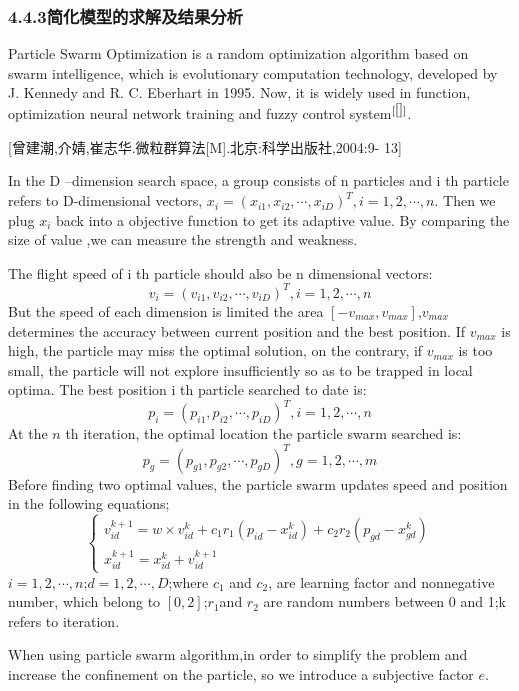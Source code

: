 \subsubsection{4.4.3简化模型的求解及结果分析}
Particle Swarm Optimization is a random optimization algorithm based on swarm intelligence, which is evolutionary computation technology, developed by J. Kennedy and R. C. Eberhart in 1995. Now, it is widely used in function, optimization neural network training and fuzzy control system$^{[\ref{}]}$.\par

[曾建潮,介婧,崔志华.微粒群算法[M].北京:科学出版社,2004:9- 13]

In the D –dimension search space, a group consists of n particles and i th particle refers to D-dimensional vectors, $x_i=(x_{i1},x_{i2},\cdots,x_{iD})^T,i=1,2,\cdots,n$. Then we plug $x_i$ back into a objective function to get its adaptive value. By comparing the size of value ,we can measure the strength and weakness.\par

The flight speed of i th particle should also be n dimensional vectors:
$$v_i=(v_{i1},v_{i2},\cdots,v_{iD})^T,i=1,2,\cdots,n$$
But the speed of each dimension is limited the area $[-v_{max},v_{max}]$,$v_{max}$ determines the accuracy between current position and the best position. If $v_{max}$ is high, the particle may miss the optimal solution, on the contrary, if $v_{max}$ is too small, the particle will not explore insufficiently so as to be trapped in local optima.
The best position i th particle searched to date is:
$$p_i=(p_{i1},p_{i2},\cdots,p_{iD})^T,i=1,2,\cdots,n$$
At the $n$ th iteration, the optimal location the particle swarm searched is:
$$p_g=(p_{g1},p_{g2},\cdots,p_{gD})^T,g=1,2,\cdots,m$$ 
Before finding two optimal values, the particle swarm updates speed and position in the following equations;
$$\begin{cases}
v_{id}^{k+1}=w \times v_{id}^k+c_1r_1(p_{id}-x_{id}^k)+c_2r_2(p_{gd}-x_{gd}^k)\\
x_{id}^{k+1}=x_{id}^k+v_{id}^{k+1}
\end{cases}$$
$i=1,2,\cdots,n$;$d=1,2,\cdots,D$;where $c_1$ and $c_2$, are learning factor and nonnegative number, which belong to $[0,2]$;$r_1$and $r_2$ are random numbers between 0 and 1;k refers to iteration.\par
When using particle swarm algorithm,in order to simplify the problem and increase the confinement on the particle, so we introduce a subjective factor $e$.
 
